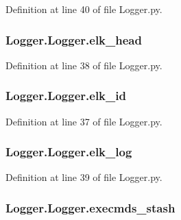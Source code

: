 Definition at line 40 of file Logger.\-py.

\hypertarget{class_logger_1_1_logger_a6bfefa570074a540e3ec42c8a43a2583}{
\subsubsection[{elk\-\_\-head}]{\setlength{\rightskip}{0pt plus 5cm}Logger.\-Logger.\-elk\-\_\-head}}\label{class_logger_1_1_logger_a6bfefa570074a540e3ec42c8a43a2583}


Definition at line 38 of file Logger.\-py.

\hypertarget{class_logger_1_1_logger_a14cdba9de890b4ddcd44f89919584663}{
\subsubsection[{elk\-\_\-id}]{\setlength{\rightskip}{0pt plus 5cm}Logger.\-Logger.\-elk\-\_\-id}}\label{class_logger_1_1_logger_a14cdba9de890b4ddcd44f89919584663}


Definition at line 37 of file Logger.\-py.

\hypertarget{class_logger_1_1_logger_a0de302776caf63f84bb88e198dcd8b37}{
\subsubsection[{elk\-\_\-log}]{\setlength{\rightskip}{0pt plus 5cm}Logger.\-Logger.\-elk\-\_\-log}}\label{class_logger_1_1_logger_a0de302776caf63f84bb88e198dcd8b37}


Definition at line 39 of file Logger.\-py.

\hypertarget{class_logger_1_1_logger_aa435d45f90a7c7b6595bbb5c14f9049d}{
\subsubsection[{execmds\-\_\-stash}]{\setlength{\rightskip}{0pt plus 5cm}Logger.\-Logger.\-execmds\-\_\-stash}}\label{class_logger_1_1_logger_aa435d45f90a7c7b6595bbb5c14f9049d}


